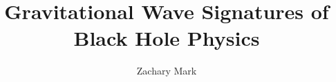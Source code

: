 \documentclass[12pt]{caltech_thesis}
\begin{document}
\title{Gravitational Wave Signatures of Black Hole Physics}
\author{Zachary Mark}


\address{Pasadena, California}                     %



\maketitle[logo]

\begin{acknowledgements} 	 
  
\end{acknowledgements}
\end{document}
